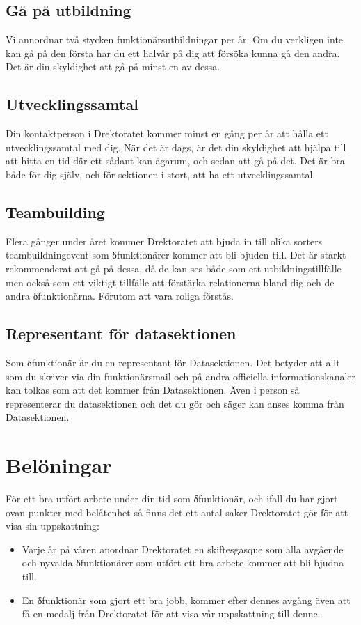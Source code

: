 \documentclass{dgovdoc}
\begin{document}
\subsection*{Gå på utbildning}
Vi annordnar två stycken funktionärsutbildningar per år. Om du verkligen inte kan gå på den första har du ett halvår på dig att försöka kunna gå den andra. Det är din skyldighet att gå på minst en av dessa. 

\subsection*{Utvecklingssamtal}
Din kontaktperson i D­rektoratet kommer minst en gång per år att hålla ett utvecklingssamtal med dig. När det är dags, är det din skyldighet att hjälpa till att hitta en tid där ett sådant kan ägarum, och sedan att gå på det. Det är bra både för dig själv, och för sektionen i stort, att ha ett utvecklingssamtal. 

\subsection*{Teambuilding}
Flera gånger under året kommer D­rektoratet att bjuda in till olika sorters teambuildningevent som δfunktionärer kommer att bli bjuden till. Det är starkt rekommenderat att gå på dessa, då de kan ses både som ett utbildningstillfälle men också som ett viktigt tillfälle att förstärka relationerna bland dig och de andra δfunktionärna. Förutom att vara roliga förstås. 

\subsection*{Representant för datasektionen}
Som δfunktionär är du en representant för Datasektionen. Det betyder att allt som du skriver via din funktionärsmail och på andra officiella informationskanaler kan tolkas som att det kommer från Datasektionen. Även i person så representerar du datasektionen och det du gör och säger kan anses komma från Datasektionen. 

\section*{Belöningar}
För ett bra utfört arbete under din tid som δfunktionär, och ifall du har gjort ovan punkter med belåtenhet så finns det ett antal saker D­rektoratet gör för att visa sin uppskattning: 

\begin{itemize}
\item Varje år på våren anordnar D­rektoratet en skiftesgasque som alla avgående och	nyvalda δfunktionärer som utfört ett bra arbete kommer att bli bjudna till. 
\item En δfunktionär som gjort ett bra jobb, kommer efter dennes avgång även att få en medalj från D­rektoratet för att visa vår uppskattning till denne.
\end{itemize}
\end{document}
